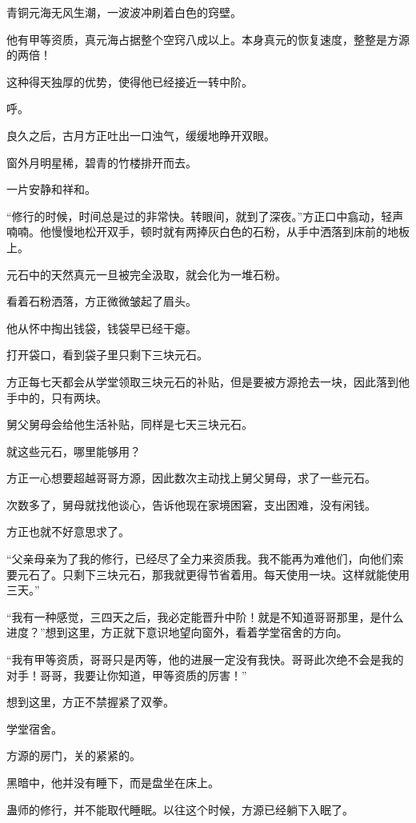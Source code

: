 \begin{this_body}
青铜元海无风生潮，一波波冲刷着白色的窍壁。

他有甲等资质，真元海占据整个空窍八成以上。本身真元的恢复速度，整整是方源的两倍！

这种得天独厚的优势，使得他已经接近一转中阶。

呼。

良久之后，古月方正吐出一口浊气，缓缓地睁开双眼。

窗外月明星稀，碧青的竹楼排开而去。

一片安静和祥和。

“修行的时候，时间总是过的非常快。转眼间，就到了深夜。”方正口中翕动，轻声喃喃。他慢慢地松开双手，顿时就有两捧灰白色的石粉，从手中洒落到床前的地板上。

元石中的天然真元一旦被完全汲取，就会化为一堆石粉。

看着石粉洒落，方正微微皱起了眉头。

他从怀中掏出钱袋，钱袋早已经干瘪。

打开袋口，看到袋子里只剩下三块元石。

方正每七天都会从学堂领取三块元石的补贴，但是要被方源抢去一块，因此落到他手中的，只有两块。

舅父舅母会给他生活补贴，同样是七天三块元石。

就这些元石，哪里能够用？

方正一心想要超越哥哥方源，因此数次主动找上舅父舅母，求了一些元石。

次数多了，舅母就找他谈心，告诉他现在家境困窘，支出困难，没有闲钱。

方正也就不好意思求了。

“父亲母亲为了我的修行，已经尽了全力来资质我。我不能再为难他们，向他们索要元石了。只剩下三块元石，那我就更得节省着用。每天使用一块。这样就能使用三天。”

“我有一种感觉，三四天之后，我必定能晋升中阶！就是不知道哥哥那里，是什么进度？”想到这里，方正就下意识地望向窗外，看着学堂宿舍的方向。

“我有甲等资质，哥哥只是丙等，他的进展一定没有我快。哥哥此次绝不会是我的对手！哥哥，我要让你知道，甲等资质的厉害！”

想到这里，方正不禁握紧了双拳。

学堂宿舍。

方源的房门，关的紧紧的。

黑暗中，他并没有睡下，而是盘坐在床上。

蛊师的修行，并不能取代睡眠。以往这个时候，方源已经躺下入眠了。


\end{this_body}
